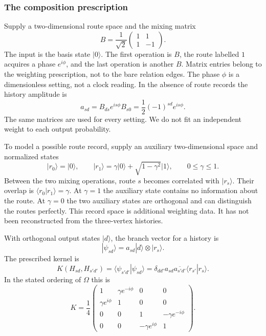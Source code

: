 \subsubsection{The composition prescription}

Supply a two-dimensional route space and the mixing matrix
\[
  B=\frac{1}{\sqrt{2}}
  \begin{pmatrix}1&1\\1&-1\end{pmatrix}.
\]
The input is the basis state $|0\rangle$. The first operation is $B$,
the route labelled $1$ acquires a phase $e^{i\phi}$, and the last operation
is another $B$. Matrix entries belong to the weighting prescription, not
to the bare relation edges. The phase $\phi$ is a dimensionless setting,
not a clock reading. In the absence of route records the history amplitude
is
\[
  a_{sd}=B_{ds}e^{is\phi}B_{s0}
        =\frac12(-1)^{sd}e^{is\phi}.
\]
The same matrices are used for every setting. We do not fit an independent
weight to each output probability.

To model a possible route record, supply an auxiliary two-dimensional
space and normalized states
\[
  |r_0\rangle=|0\rangle,\qquad
  |r_1\rangle=\gamma|0\rangle+\sqrt{1-\gamma^2}|1\rangle,
  \qquad 0\leq\gamma\leq1.
\]
Between the two mixing operations, route $s$ becomes correlated with
$|r_s\rangle$. Their overlap is $\langle r_0|r_1\rangle=\gamma$.
At $\gamma=1$ the auxiliary state contains no information about the route.
At $\gamma=0$ the two auxiliary states are orthogonal and can distinguish
the routes perfectly. This record space is additional weighting data.
It has not been reconstructed from the three-vertex histories.

With orthogonal output states $|d\rangle$, the branch vector for a history
is
\[
  |\psi_{sd}\rangle=a_{sd}|d\rangle\otimes|r_s\rangle.
\]
The prescribed kernel is
\[
  K(H_{sd},H_{s'd'})
   =\langle\psi_{s'd'}|\psi_{sd}\rangle
   =\delta_{dd'}a_{sd}\overline{a_{s'd'}}
      \langle r_{s'}|r_s\rangle.
\]
In the stated ordering of $\Omega$ this is
\begin{equation}
  K=\frac14
  \begin{pmatrix}
    1&\gamma e^{-i\phi}&0&0\\
    \gamma e^{i\phi}&1&0&0\\
    0&0&1&-\gamma e^{-i\phi}\\
    0&0&-\gamma e^{i\phi}&1
  \end{pmatrix}.
  \label{eq:toykernel}
\end{equation}

